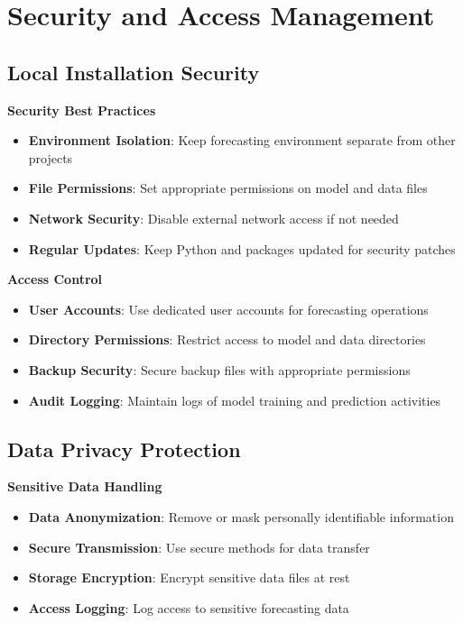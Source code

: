 \section{Security and Access Management}

\subsection{Local Installation Security}

\textbf{Security Best Practices}
\begin{itemize}
	\item \textbf{Environment Isolation}: Keep forecasting environment separate from other projects
	\item \textbf{File Permissions}: Set appropriate permissions on model and data files
	\item \textbf{Network Security}: Disable external network access if not needed
	\item \textbf{Regular Updates}: Keep Python and packages updated for security patches
\end{itemize}

\textbf{Access Control}
\begin{itemize}
	\item \textbf{User Accounts}: Use dedicated user accounts for forecasting operations
	\item \textbf{Directory Permissions}: Restrict access to model and data directories
	\item \textbf{Backup Security}: Secure backup files with appropriate permissions
	\item \textbf{Audit Logging}: Maintain logs of model training and prediction activities
\end{itemize}

\subsection{Data Privacy Protection}

\textbf{Sensitive Data Handling}
\begin{itemize}
	\item \textbf{Data Anonymization}: Remove or mask personally identifiable information
	\item \textbf{Secure Transmission}: Use secure methods for data transfer
	\item \textbf{Storage Encryption}: Encrypt sensitive data files at rest
	\item \textbf{Access Logging}: Log access to sensitive forecasting data
\end{itemize}

